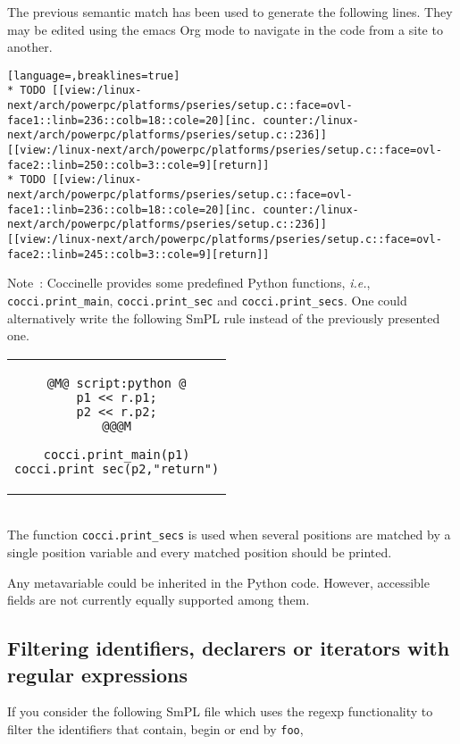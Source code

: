 The previous semantic match has been used to generate the following
lines. They may be edited using the emacs Org mode to navigate in the code
from a site to another.

\begin{lstlisting}[language=,breaklines=true]
* TODO [[view:/linux-next/arch/powerpc/platforms/pseries/setup.c::face=ovl-face1::linb=236::colb=18::cole=20][inc. counter:/linux-next/arch/powerpc/platforms/pseries/setup.c::236]]
[[view:/linux-next/arch/powerpc/platforms/pseries/setup.c::face=ovl-face2::linb=250::colb=3::cole=9][return]]
* TODO [[view:/linux-next/arch/powerpc/platforms/pseries/setup.c::face=ovl-face1::linb=236::colb=18::cole=20][inc. counter:/linux-next/arch/powerpc/platforms/pseries/setup.c::236]]
[[view:/linux-next/arch/powerpc/platforms/pseries/setup.c::face=ovl-face2::linb=245::colb=3::cole=9][return]]
\end{lstlisting}

Note~: Coccinelle provides some predefined Python functions,
\emph{i.e.}, \texttt{cocci.print\_main}, \texttt{cocci.print\_sec} and
\texttt{cocci.print\_secs}. One could alternatively write the following
SmPL rule instead of the previously presented one.

\begin{tabular}{c}
\begin{lstlisting}[language=Cocci]
@M@ script:python @
p1 << r.p1;
p2 << r.p2;
@@@M

cocci.print_main(p1)
cocci.print_sec(p2,"return")
\end{lstlisting}
\end{tabular}\\

The function \texttt{cocci.print\_secs} is used when several
positions are matched by a single position variable and
every matched position should be printed.

Any metavariable could be inherited in the Python code. However,
accessible fields are not currently equally supported among them.

\newpage
\subsection{Filtering identifiers, declarers or iterators with regular expressions}

If you consider the following SmPL file which uses the regexp functionality to
filter the identifiers that contain, begin or end by \texttt{foo},

